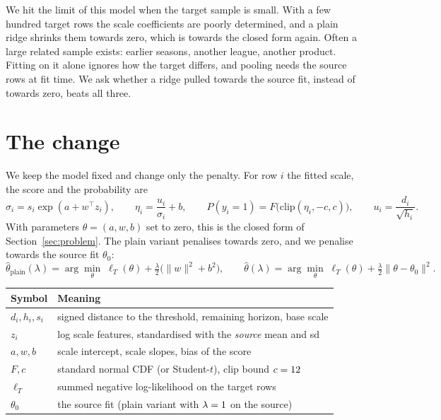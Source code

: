 \documentclass{article}
\begin{document}
We hit the limit of this model when the target sample is small.
With a few hundred target rows the scale coefficients are poorly determined, and a plain ridge shrinks them towards zero, which is towards the closed form again.
Often a large related sample exists: earlier seasons, another league, another product.
Fitting on it alone ignores how the target differs, and pooling needs the source rows at fit time.
We ask whether a ridge pulled towards the source fit, instead of towards zero, beats all three.

\section{The change}
\label{sec:change}

We keep the model fixed and change only the penalty.
For row $i$ the fitted scale, the score and the probability are
\begin{equation}
\sigma_i = s_i \exp(a + w^\top z_i), \qquad
\eta_i = \frac{u_i}{\sigma_i} + b, \qquad
P(y_i = 1) = F\bigl(\mathrm{clip}(\eta_i, -c, c)\bigr), \qquad
u_i = \frac{d_i}{\sqrt{h_i}}.
\label{eq:model}
\end{equation}
With parameters $\theta = (a, w, b)$ set to zero, this is the closed form of Section~\ref{sec:problem}.
The plain variant penalises towards zero, and we penalise towards the source fit $\theta_0$:
\begin{equation}
\hat\theta_{\text{plain}}(\lambda) = \arg\min_\theta\; \ell_T(\theta) + \tfrac{\lambda}{2}\bigl(\lVert w\rVert^2 + b^2\bigr),
\qquad
\hat\theta(\lambda) = \arg\min_\theta\; \ell_T(\theta) + \tfrac{\lambda}{2}\lVert \theta - \theta_0\rVert^2 .
\label{eq:ridge}
\end{equation}

{\centering\small
\begin{tabular}{ll}
\toprule
Symbol & Meaning \\
\midrule
$d_i, h_i, s_i$ & signed distance to the threshold, remaining horizon, base scale \\
$z_i$ & log scale features, standardised with the \emph{source} mean and sd \\
$a, w, b$ & scale intercept, scale slopes, bias of the score \\
$F, c$ & standard normal CDF (or Student-$t$), clip bound $c = 12$ \\
$\ell_T$ & summed negative log-likelihood on the target rows \\
$\theta_0$ & the source fit (plain variant with $\lambda = 1$ on the source) \\
\bottomrule
\end{tabular}
\par}
\vspace{2pt}
\end{document}
